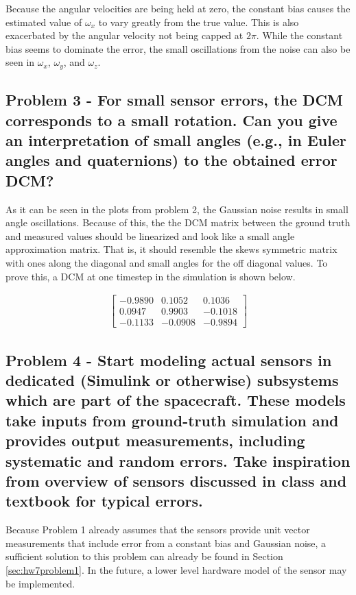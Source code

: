 Because the angular velocities are being held at zero, the constant bias causes the estimated value of $\omega_x$ to vary greatly from the true value. This is also exacerbated by the angular velocity not being capped at $2\pi$. While the constant bias seems to dominate the error, the small oscillations from the noise can also be seen in $\omega_x$, $\omega_y$, and $\omega_z$.

\subsection{Problem 3 - For small sensor errors, the DCM corresponds to a small rotation. Can you give an interpretation of small angles (e.g., in Euler angles and quaternions) to the obtained error DCM?}

As it can be seen in the plots from problem 2, the Gaussian noise results in small angle oscillations. Because of this, the the DCM matrix between the ground truth and measured values should be linearized and look like a small angle approximation matrix. That is, it should resemble the skews symmetric matrix with ones along the diagonal and small angles for the off diagonal values. To prove this, a DCM at one timestep in the simulation is shown below.

\begin{align*}
\begin{bmatrix}
    -0.9890   &  0.1052  &  0.1036 \\
    0.0947  &  0.9903  & -0.1018 \\
   -0.1133 &  -0.0908 &  -0.9894
\end{bmatrix}
\end{align*}



\subsection{Problem 4 - Start modeling actual sensors in dedicated (Simulink or otherwise) subsystems which are part of the spacecraft. These models take inputs from ground-truth simulation and provides output measurements, including systematic and random errors. Take inspiration from overview of sensors discussed in class and
textbook for typical errors.}

Because Problem 1 already assumes that the sensors provide unit vector measurements that include error from a constant bias and Gaussian noise, a sufficient solution to this problem can already be found in Section \ref{sec:hw7problem1}. In the future, a lower level hardware model of the sensor may be implemented.

